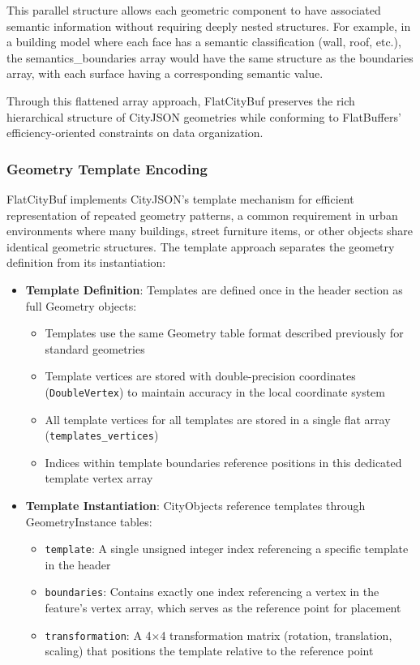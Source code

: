 This parallel structure allows each geometric component to have associated semantic information without requiring deeply nested structures. For example, in a building model where each face has a semantic classification (wall, roof, etc.), the semantics\_boundaries array would have the same structure as the boundaries array, with each surface having a corresponding semantic value.

Through this flattened array approach, FlatCityBuf preserves the rich hierarchical structure of CityJSON geometries while conforming to FlatBuffers' efficiency-oriented constraints on data organization.

\subsubsection{Geometry Template Encoding}
\label{methodology:feature_encoding:geometry_encoding:templates}

FlatCityBuf implements CityJSON's template mechanism for efficient representation of repeated geometry patterns, a common requirement in urban environments where many buildings, street furniture items, or other objects share identical geometric structures. The template approach separates the geometry definition from its instantiation:

\begin{itemize}
  \item \textbf{Template Definition}: Templates are defined once in the header section as full Geometry objects:
    \begin{itemize}
      \item Templates use the same Geometry table format described previously for standard geometries
      \item Template vertices are stored with double-precision coordinates (\texttt{DoubleVertex}) to maintain accuracy in the local coordinate system
      \item All template vertices for all templates are stored in a single flat array (\texttt{templates\_vertices})
      \item Indices within template boundaries reference positions in this dedicated template vertex array
    \end{itemize}

  \item \textbf{Template Instantiation}: CityObjects reference templates through GeometryInstance tables:
    \begin{itemize}
      \item \texttt{template}: A single unsigned integer index referencing a specific template in the header
      \item \texttt{boundaries}: Contains exactly one index referencing a vertex in the feature's vertex array, which serves as the reference point for placement
      \item \texttt{transformation}: A 4×4 transformation matrix (rotation, translation, scaling) that positions the template relative to the reference point
    \end{itemize}
\end{itemize}

